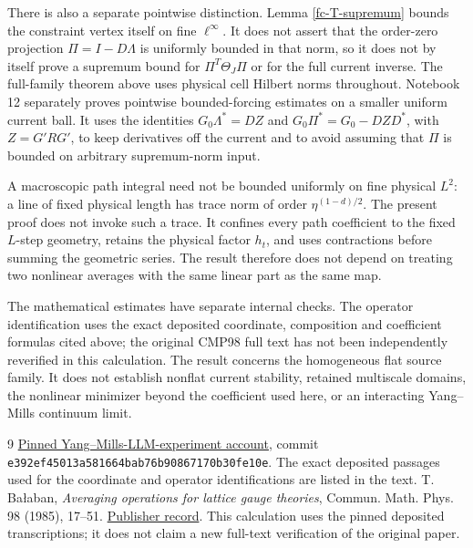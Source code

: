 \documentclass[11pt]{article}
\theoremstyle{remark}
\begin{document}
There is also a separate pointwise distinction. Lemma
\ref{fc-T-supremum} bounds the constraint vertex itself on fine
$\ell^\infty$. It does not assert that the order-zero projection
$\Pi=I-D\Lambda$ is uniformly bounded in that norm, so it does not
by itself prove a supremum bound for $\Pi^T\Theta_J\Pi$ or for the
full current inverse. The full-family theorem above uses physical
cell Hilbert norms throughout.
Notebook 12 separately proves pointwise bounded-forcing estimates
on a smaller uniform current ball. It uses the identities
$G_0\Lambda^*=DZ$ and $G_0\Pi^*=G_0-DZD^*$, with
$Z=G'RG'$, to keep derivatives off the current and to avoid
assuming that $\Pi$ is bounded on arbitrary supremum-norm input.

A macroscopic path integral need not be bounded uniformly on fine
physical $L^2$: a line of fixed physical length has trace norm of
order $\eta^{(1-d)/2}$. The present proof does not invoke such a
trace. It confines every path coefficient to the fixed $L$-step
geometry, retains the physical factor $h_t$, and uses contractions
before summing the geometric series. The result therefore does not
depend on treating two nonlinear averages with the same linear
part as the same map.

The mathematical estimates have separate internal checks. The
operator identification uses the exact deposited coordinate,
composition and coefficient formulas cited above; the original
CMP98 full text has not been independently reverified in this
calculation. The result concerns the homogeneous flat source
family. It does not establish nonflat current stability, retained
multiscale domains, the nonlinear minimizer beyond the coefficient
used here, or an interacting Yang--Mills continuum limit.

\begin{thebibliography}{9}
\href{https://github.com/ethanwsussman/Yang--Mills-LLM-experiment/tree/e392ef45013a581664bab76b90867170b30fe10e}
{Pinned Yang--Mills-LLM-experiment account}, commit
\texttt{e392ef45013a581664bab76b90867170b30fe10e}.
The exact deposited passages used for the coordinate and operator
identifications are listed in the text.
T. Ba\l aban, \emph{Averaging operations for lattice gauge theories},
Commun. Math. Phys. 98 (1985), 17--51.
\href{https://doi.org/10.1007/BF01211042}{Publisher record}.
This calculation uses the pinned deposited transcriptions; it does not
claim a new full-text verification of the original paper.
\end{thebibliography}
\end{document}
